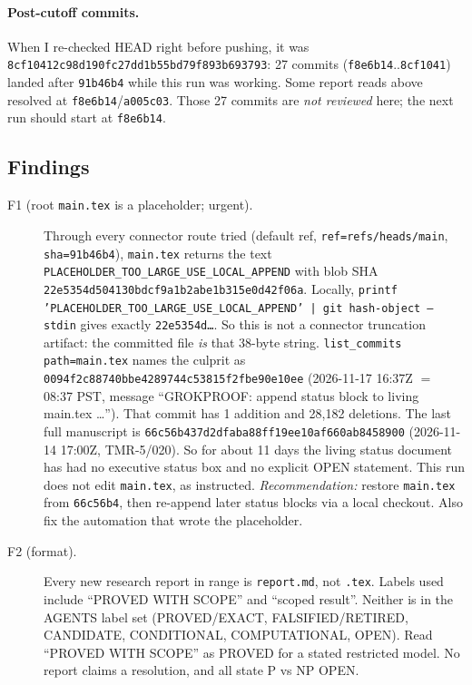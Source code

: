 \documentclass[11pt]{article}
\theoremstyle{remark}
\begin{document}
\paragraph{Post-cutoff commits.} When I re-checked HEAD right before pushing, it was \texttt{8cf10412c98d190fc27dd1b55bd79f893b693793}: 27 commits (\texttt{f8e6b14}..\texttt{8cf1041}) landed after \texttt{91b46b4} while this run was working. Some report reads above resolved at \texttt{f8e6b14}/\texttt{a005c03}. Those 27 commits are \emph{not reviewed} here; the next run should start at \texttt{f8e6b14}.

\subsection{Findings}
\begin{description}
\item[F1 (root \texttt{main.tex} is a placeholder; urgent).] Through every connector
route tried (default ref, \texttt{ref=refs/heads/main}, \texttt{sha=91b46b4}), \texttt{main.tex} returns the
text \texttt{PLACEHOLDER\_TOO\_LARGE\_USE\_LOCAL\_APPEND} with blob SHA
\texttt{22e5354d504130bdcf9a1b2abe1b315e0d42f06a}. Locally,
\texttt{printf 'PLACEHOLDER\_TOO\_LARGE\_USE\_LOCAL\_APPEND' | git hash-object --stdin}
gives exactly \texttt{22e5354d\ldots}. So this is not a connector truncation artifact:
the committed file \emph{is} that 38-byte string. \texttt{list\_commits path=main.tex}
names the culprit as \texttt{0094f2c88740bbe4289744c53815f2fbe90e10ee} (2026-11-17 16:37Z $=$ 08:37 PST,
message ``GROKPROOF: append status block to living main.tex \ldots''). That commit has 1 addition and
28{,}182 deletions. The last full manuscript is \texttt{66c56b437d2dfaba88ff19ee10af660ab8458900}
(2026-11-14 17:00Z, TMR-5/020). So for about 11 days the living status document has had no
executive status box and no explicit OPEN statement. This run does not edit \texttt{main.tex}, as instructed.
\emph{Recommendation:} restore \texttt{main.tex} from \texttt{66c56b4}, then re-append later status
blocks via a local checkout. Also fix the automation that wrote the placeholder.
\item[F2 (format).] Every new research report in range is \texttt{report.md}, not \texttt{.tex}.
Labels used include ``PROVED WITH SCOPE'' and ``scoped result''. Neither is in the AGENTS label set
(PROVED/EXACT, FALSIFIED/RETIRED, CANDIDATE, CONDITIONAL, COMPUTATIONAL, OPEN). Read
``PROVED WITH SCOPE'' as PROVED for a stated restricted model. No report claims a resolution, and all state P vs NP OPEN.

\end{description}
\end{document}
